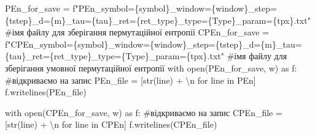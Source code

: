 \documentclass[
  letterpaper,
]{report}
\newenvironment{Shaded}{\begin{snugshade}}{\end{snugshade}}
\newcommand{\BuiltInTok}[1]{\textcolor[rgb]{0.00,0.23,0.31}{#1}}
\newcommand{\CharTok}[1]{\textcolor[rgb]{0.13,0.47,0.30}{#1}}
\newcommand{\CommentTok}[1]{\textcolor[rgb]{0.37,0.37,0.37}{#1}}
\newcommand{\ControlFlowTok}[1]{\textcolor[rgb]{0.00,0.23,0.31}{#1}}
\newcommand{\ImportTok}[1]{\textcolor[rgb]{0.00,0.46,0.62}{#1}}
\newcommand{\KeywordTok}[1]{\textcolor[rgb]{0.00,0.23,0.31}{#1}}
\newcommand{\NormalTok}[1]{\textcolor[rgb]{0.00,0.23,0.31}{#1}}
\newcommand{\OperatorTok}[1]{\textcolor[rgb]{0.37,0.37,0.37}{#1}}
\newcommand{\SpecialCharTok}[1]{\textcolor[rgb]{0.37,0.37,0.37}{#1}}
\newcommand{\SpecialStringTok}[1]{\textcolor[rgb]{0.13,0.47,0.30}{#1}}
\newcommand{\StringTok}[1]{\textcolor[rgb]{0.13,0.47,0.30}{#1}}
\begin{document}
\begin{Shaded}
\begin{Highlighting}[]
\NormalTok{PEn\_for\_save }\OperatorTok{=} \SpecialStringTok{f"PEn\_symbol=}\SpecialCharTok{\{}\NormalTok{symbol}\SpecialCharTok{\}}\SpecialStringTok{\_window=}\SpecialCharTok{\{}\NormalTok{window}\SpecialCharTok{\}}\SpecialStringTok{\_step=}\SpecialCharTok{\{}\NormalTok{tstep}\SpecialCharTok{\}}\SpecialStringTok{\_d=}\SpecialCharTok{\{}\NormalTok{m}\SpecialCharTok{\}}\SpecialStringTok{\_tau=}\SpecialCharTok{\{}\NormalTok{tau}\SpecialCharTok{\}}\SpecialStringTok{\_ret=}\SpecialCharTok{\{}\NormalTok{ret\_type}\SpecialCharTok{\}}\SpecialStringTok{\_type=}\SpecialCharTok{\{}\NormalTok{Type}\SpecialCharTok{\}}\SpecialStringTok{\_param=}\SpecialCharTok{\{}\NormalTok{tpx}\SpecialCharTok{\}}\SpecialStringTok{.txt"} \CommentTok{\#ім\textquotesingle{}я файлу для зберігання пермутаційної ентропії}
\NormalTok{CPEn\_for\_save }\OperatorTok{=} \SpecialStringTok{f"CPEn\_symbol=}\SpecialCharTok{\{}\NormalTok{symbol}\SpecialCharTok{\}}\SpecialStringTok{\_window=}\SpecialCharTok{\{}\NormalTok{window}\SpecialCharTok{\}}\SpecialStringTok{\_step=}\SpecialCharTok{\{}\NormalTok{tstep}\SpecialCharTok{\}}\SpecialStringTok{\_d=}\SpecialCharTok{\{}\NormalTok{m}\SpecialCharTok{\}}\SpecialStringTok{\_tau=}\SpecialCharTok{\{}\NormalTok{tau}\SpecialCharTok{\}}\SpecialStringTok{\_ret=}\SpecialCharTok{\{}\NormalTok{ret\_type}\SpecialCharTok{\}}\SpecialStringTok{\_type=}\SpecialCharTok{\{}\NormalTok{Type}\SpecialCharTok{\}}\SpecialStringTok{\_param=}\SpecialCharTok{\{}\NormalTok{tpx}\SpecialCharTok{\}}\SpecialStringTok{.txt"} \CommentTok{\#ім\textquotesingle{}я файлу для зберігання умовної пермутаційної ентропії}
\ControlFlowTok{with} \BuiltInTok{open}\NormalTok{(PEn\_for\_save, }\StringTok{\textquotesingle{}w\textquotesingle{}}\NormalTok{) }\ImportTok{as}\NormalTok{ f: }\CommentTok{\#відкриваємо на запис }
\NormalTok{    PEn\_file }\OperatorTok{=}\NormalTok{ [}\BuiltInTok{str}\NormalTok{(line) }\OperatorTok{+} \StringTok{\textquotesingle{}}\CharTok{\textbackslash{}n}\StringTok{\textquotesingle{}} \ControlFlowTok{for}\NormalTok{ line }\KeywordTok{in}\NormalTok{ PEn]}
\NormalTok{    f.writelines(PEn\_file)}
    
\ControlFlowTok{with} \BuiltInTok{open}\NormalTok{(CPEn\_for\_save, }\StringTok{\textquotesingle{}w\textquotesingle{}}\NormalTok{) }\ImportTok{as}\NormalTok{ f: }\CommentTok{\#відкриваємо на запис }
\NormalTok{    CPEn\_file }\OperatorTok{=}\NormalTok{ [}\BuiltInTok{str}\NormalTok{(line) }\OperatorTok{+} \StringTok{\textquotesingle{}}\CharTok{\textbackslash{}n}\StringTok{\textquotesingle{}} \ControlFlowTok{for}\NormalTok{ line }\KeywordTok{in}\NormalTok{ CPEn]}
\NormalTok{    f.writelines(CPEn\_file)}
\end{Highlighting}
\end{Shaded}
\end{document}
